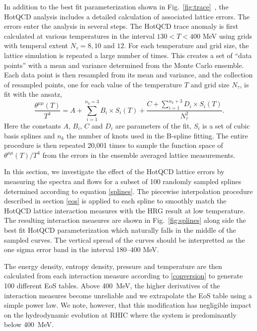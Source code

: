 \documentclass[aps,prc,reprint,amsmath,nofootinbib,superscriptaddress]{revtex4-1}
\begin{document}
In addition to the best fit parameterization shown in Fig.~\ref{fig:trace}~, the HotQCD analysis includes a detailed calculation of associated lattice errors. The errors enter the analysis in several steps.
The HotQCD trace anomaly is first calculated at various temperatures in the interval $130 < T < 400$ MeV using grids with temperal extent $N_\tau = 8,10$ and $12$.
For each temperature and grid size, the lattice simulation is repeated a large number of times. 
This creates a set of ``data points'' with a mean and variance determined from the Monte Carlo ensemble. 
Each data point is then resampled from its mean and variance, and the collection of resampled points, one for each value of the temperature $T$ and grid size $N_\tau$, is fit with the ansatz,
\begin{equation}
 \label{splines}
 \frac{\theta^{\mu\mu}(T)}{T^4} = A + \sum\limits_{i=1}^{n_k=3} B_i \times S_i(T) + \frac{C + \sum_{i=1}^{n_k + 3} D_i \times S_i(T)}{N_\tau^2}.
\end{equation}
Here the constants $A$, $B_i$, $C$ and $D_i$ are parameters of the fit, $S_i$ is a set of cubic basis splines and $n_k$ the number of knots used in the B-spline fitting. 
The entire procedure is then repeated 20,001 times to sample the function space of $\theta^{\mu\mu}(T)/T^4$ from the errors in the ensemble averaged lattice measurements.

In this section, we investigate the effect of the HotQCD lattice errors by measuring the spectra and flows for a subset of 100 randomly sampled splines determined according to equation \eqref{splines}.
The piecewise interpolation procedure described in section \ref{eos} is applied to each spline to smoothly match the HotQCD lattice interaction measures with the HRG result at low temperature. 
The resulting interaction measures are shown in Fig.~\ref{fig:splines} along side the best fit HotQCD parameterization which naturally falls in the middle of the sampled curves. 
The vertical spread of the curves should be interpretted as the one sigma error band in the interval 180--400 MeV. 

The energy density, entropy density, pressure and temperature are then calculated from each interaction measure according to \eqref{conversion} to generate 100 different EoS tables. 
Above 400~MeV, the higher derivatives of the interaction measures become unreliable and we extrapolate the EoS table using a simple power law. 
We note, however, that this modification has negligible impact on the hydrodynamic evolution at RHIC where the system is predominantly below 400~MeV.
\end{document}
